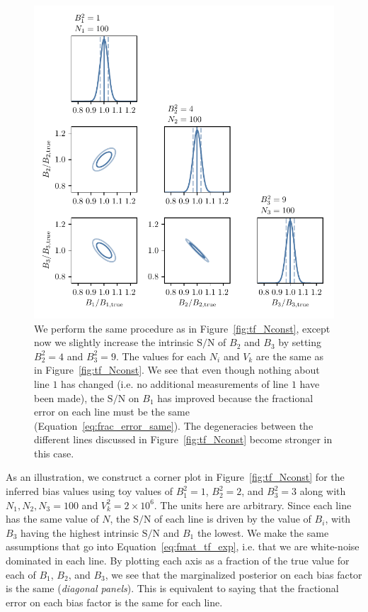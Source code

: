 \documentclass{aastex62}
\newcommand{\SN}{\ensuremath{\text{S}/\text{N}}}
\begin{document}
\begin{figure}[h!]
\begin{center}
\includegraphics{fig/corner_Nconstant_Bhigher.pdf}
\end{center}
\caption{We perform the same procedure as in Figure~\ref{fig:tf_Nconst}, except
now we slightly increase the intrinsic \SN{} of $B_2$ and $B_3$ by setting
$B_2^2 = 4$ and $B_3^2 = 9$. The values for each $N_i$ and $V_k$ are the same
as in Figure~\ref{fig:tf_Nconst}. We see that even though nothing about line
$1$ has changed (i.e. no additional measurements of line $1$ have been made),
the \SN{} on $B_1$ has improved because the fractional error on each line must
be the same (Equation~\ref{eq:frac_error_same}). The degeneracies between the
different lines discussed in Figure~\ref{fig:tf_Nconst} become stronger in
this case.}
\label{fig:tf_Nconst_Bhigher}
\end{figure}

As an illustration, we construct a corner plot in Figure~\ref{fig:tf_Nconst}
for the inferred bias values using toy values of $B_1^2 = 1$, $B_2^2 = 2$, and
$B_3^2 = 3$ along with $N_1, N_2, N_3 = 100$ and $V_k^2 = 2\times10^6$. The
units here are arbitrary. Since each line has the same value of $N$, the \SN{}
of each line is driven by the value of $B_i$, with $B_3$ having the highest
intrinsic \SN{} and $B_1$ the lowest. We make the same assumptions that go
into Equation~\ref{eq:fmat_tf_exp}, i.e. that we are white-noise dominated in
each line. By plotting each axis as a fraction of the true value for each of
$B_1$, $B_2$, and $B_3$, we see that the marginalized posterior on each bias
factor is the same (\textit{diagonal panels}). This is equivalent to saying
that the fractional error on each bias factor is the same for each line.
\end{document}
